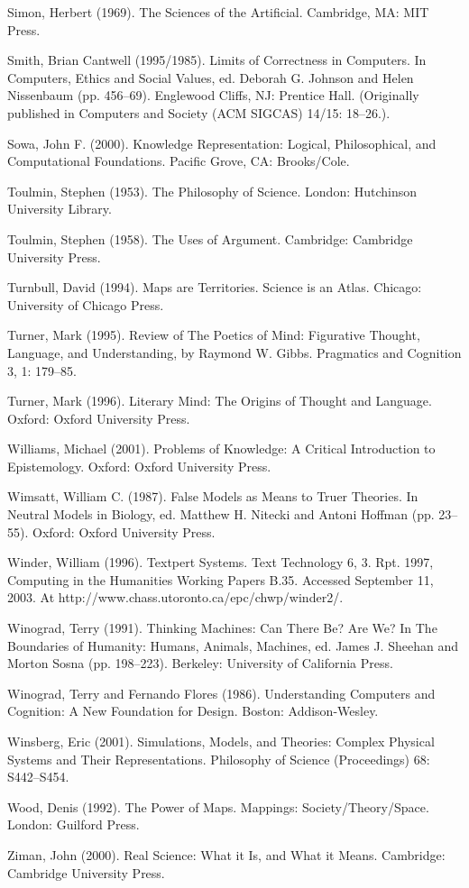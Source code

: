 Simon, Herbert (1969). The Sciences of the Artificial. Cambridge, MA: MIT Press.

Smith, Brian Cantwell (1995/1985). Limits of Correctness in Computers. In Computers, Ethics and Social Values, ed. Deborah G. Johnson and Helen Nissenbaum (pp. 456–69). Englewood Cliffs, NJ: Prentice Hall. (Originally published in Computers and Society (ACM SIGCAS) 14/15: 18–26.).

Sowa, John F. (2000). Knowledge Representation: Logical, Philosophical, and Computational Foundations. Pacific Grove, CA: Brooks/Cole.

Toulmin, Stephen (1953). The Philosophy of Science. London: Hutchinson University Library.

Toulmin, Stephen (1958). The Uses of Argument. Cambridge: Cambridge University Press.

Turnbull, David (1994). Maps are Territories. Science is an Atlas. Chicago: University of Chicago Press.

Turner, Mark (1995). Review of The Poetics of Mind: Figurative Thought, Language, and Understanding, by Raymond W. Gibbs. Pragmatics and Cognition 3, 1: 179–85.

Turner, Mark (1996). Literary Mind: The Origins of Thought and Language. Oxford: Oxford University Press.

Williams, Michael (2001). Problems of Knowledge: A Critical Introduction to Epistemology. Oxford: Oxford University Press.

Wimsatt, William C. (1987). False Models as Means to Truer Theories. In Neutral Models in Biology, ed. Matthew H. Nitecki and Antoni Hoffman (pp. 23–55). Oxford: Oxford University Press.

Winder, William (1996). Textpert Systems. Text Technology 6, 3. Rpt. 1997, Computing in the Humanities Working Papers B.35. Accessed September 11, 2003. At http://www.chass.utoronto.ca/epc/chwp/winder2/.

Winograd, Terry (1991). Thinking Machines: Can There Be? Are We? In The Boundaries of Humanity: Humans, Animals, Machines, ed. James J. Sheehan and Morton Sosna (pp. 198–223). Berkeley: University of California Press.

Winograd, Terry and Fernando Flores (1986). Understanding Computers and Cognition: A New Foundation for Design. Boston: Addison-Wesley.

Winsberg, Eric (2001). Simulations, Models, and Theories: Complex Physical Systems and Their Representations. Philosophy of Science (Proceedings) 68: S442–S454.

Wood, Denis (1992). The Power of Maps. Mappings: Society/Theory/Space. London: Guilford Press.

Ziman, John (2000). Real Science: What it Is, and What it Means. Cambridge: Cambridge University Press.